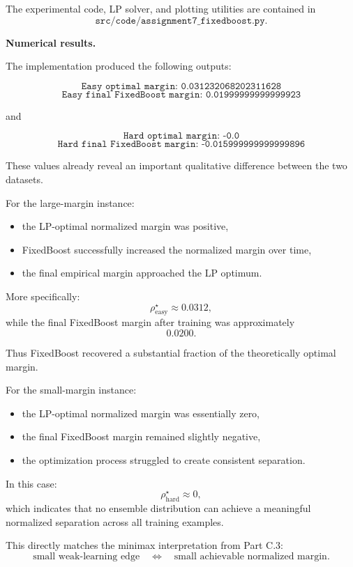 \documentclass[11pt]{article}
\begin{document}
\begin{enumerate}
\begin{solutionbox}
The experimental code, LP solver, and plotting utilities are contained in
\[
\texttt{src/code/assignment7\_fixedboost.py}.
\]

\medskip

\textbf{Numerical results.}

The implementation produced the following outputs:

\[
\texttt{Easy optimal margin: 0.031232068202311628}
\]
\[
\texttt{Easy final FixedBoost margin: 0.01999999999999923}
\]

and

\[
\texttt{Hard optimal margin: -0.0}
\]
\[
\texttt{Hard final FixedBoost margin: -0.015999999999999896}
\]

These values already reveal an important qualitative difference between the two datasets.

\medskip

For the large-margin instance:
\begin{itemize}
    \item the LP-optimal normalized margin was positive,
    \item FixedBoost successfully increased the normalized margin over time,
    \item the final empirical margin approached the LP optimum.
\end{itemize}

More specifically:
\[
\rho^\star_{\text{easy}}
\approx
0.0312,
\]
while the final FixedBoost margin after training was approximately
\[
0.0200.
\]

Thus FixedBoost recovered a substantial fraction of the theoretically optimal margin.

\medskip

For the small-margin instance:
\begin{itemize}
    \item the LP-optimal normalized margin was essentially zero,
    \item the final FixedBoost margin remained slightly negative,
    \item the optimization process struggled to create consistent separation.
\end{itemize}

In this case:
\[
\rho^\star_{\text{hard}}
\approx
0,
\]
which indicates that no ensemble distribution can achieve a meaningful normalized separation across all training examples.

This directly matches the minimax interpretation from Part C.3:
\[
\text{small weak-learning edge}
\quad\Longleftrightarrow\quad
\text{small achievable normalized margin}.
\]


\end{solutionbox}
\end{enumerate}
\end{document}
